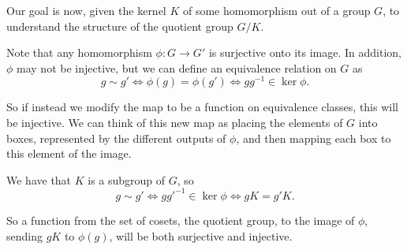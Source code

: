 Our goal is now, given the kernel $K$ of some homomorphism out of a group $G$, to understand the structure of the quotient group $G/K$.

Note that any homomorphism $\phi:G\to G'$ is surjective onto its image. In addition, $\phi$ may not be injective, but we can define an equivalence relation on $G$ as 
\[g\sim g' \iff \phi(g)=\phi(g')\iff gg^{-1}\in \ker\phi.\]

So if instead we modify the map to be a function on equivalence classes, this will be injective. We can think of this new map as placing the elements of $G$ into boxes, represented by the different outputs of $\phi$, and then mapping each box to this element of the image.

We have that $K$ is a subgroup of $G$, so 
$$
g\sim g' \iff  gg'^{-1}\in \ker\phi \iff gK = g'K.
$$

So a function from the set of cosets, the quotient group, to the image of $\phi$, sending $gK$ to $\phi(g)$, will be both surjective and injective.







